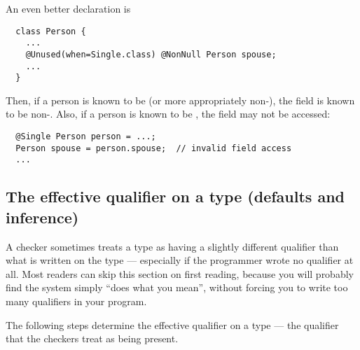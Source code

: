 An even better declaration is

\begin{Verbatim}
  class Person {
    ...
    @Unused(when=Single.class) @NonNull Person spouse;
    ...
  }
\end{Verbatim}

Then, if a person is known to be  (or more
appropriately non-), the  field is known to
be non-.  Also, if a person is known to be ,
the  field may not be accessed:
 
\begin{Verbatim}
  @Single Person person = ...;
  Person spouse = person.spouse;  // invalid field access
  ...
\end{Verbatim}


\subsection{The effective qualifier on a type (defaults and inference)\label{effective-qualifier}}

A checker sometimes treats a type as having a slightly different qualifier
than what is written on the type --- especially if the programmer wrote no
qualifier at all.
Most readers can skip this section on first reading, because you will
probably find the system simply ``does what you mean'', without forcing
you to write too many qualifiers in your program.

  The following steps determine the effective
qualifier on a type --- the qualifier that the checkers treat as being present.


